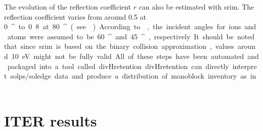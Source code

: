 The evolution of the reflection coefficient $r$ can also be estimated with \gls{srim}.
The reflection coefficient varies from around 0.5 at \SI{0}{^\circ} to 0.8 at \SI{80}{^\circ} (see ).
According to , the incident angles for ions and atoms were assumed to be \SI{60}{^\circ} and \SI{45}{^\circ}, respectively.
It should be noted that since \gls{srim} is based on the binary collision approximation, values around \SI{10}{eV} might not be fully valid.

All of these steps have been automated and packaged into a tool called divHretention.
divHretention can directly interpret \gls{solps}/\gls{soledge} data and produce a distribution of \gls{monoblock} \gls{inventory} as in .

\section{ITER results}

